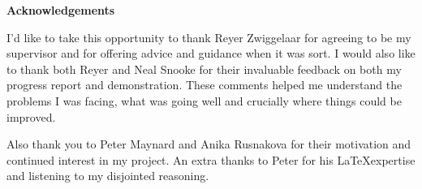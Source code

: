 \thispagestyle{empty}

\begin{center}
    {\LARGE\bf Acknowledgements}
\end{center}

I'd like to take this opportunity to thank Reyer Zwiggelaar for agreeing to be my supervisor and for offering advice and guidance when it was sort. I would also like to thank both Reyer and Neal Snooke for their invaluable feedback on both my progress report and demonstration. These comments helped me understand the problems I was facing, what was going well and crucially where things could be improved.

Also thank you to Peter Maynard and Anika Rusnakova for their motivation and continued interest in my project. An extra thanks to Peter for his \LaTeX \hspace{1mm}expertise and listening to my disjointed reasoning.